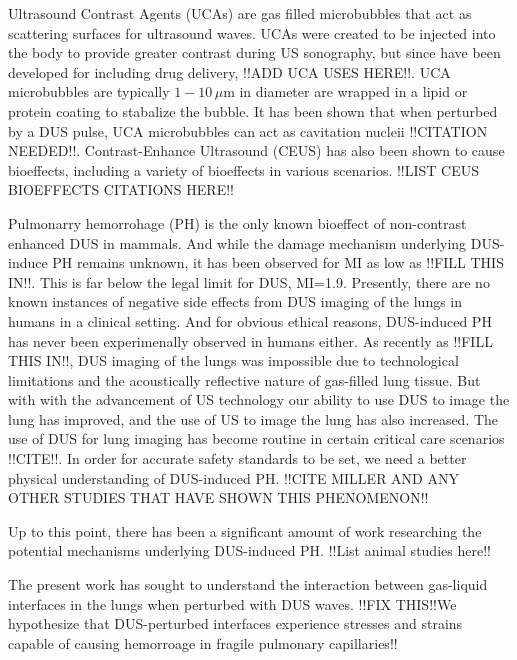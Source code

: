 Ultrasound Contrast Agents (UCAs) are gas filled microbubbles that act as scattering surfaces for ultrasound waves.
UCAs were created to be injected into the body to provide greater contrast during US sonography, but since have been developed for including drug delivery, !!ADD UCA USES HERE!!.
UCA microbubbles are typically $1 - 10 \, \mu$m in diameter are wrapped in a lipid or protein coating to stabalize the bubble.  
It has been shown that when perturbed by a DUS pulse, UCA microbubbles can act as cavitation nucleii !!CITATION NEEDED!!.
Contrast-Enhance Ultrasound (CEUS) has also been shown to cause bioeffects, including a variety of bioeffects in various scenarios.  
!!LIST CEUS BIOEFFECTS CITATIONS HERE!!


Pulmonarry hemorrohage (PH) is the only known bioeffect of non-contrast enhanced DUS in mammals.
And while the damage mechanism underlying DUS-induce PH remains unknown, it has been observed for MI as low as !!FILL THIS IN!!. 
This is far below the legal limit for DUS, MI=1.9.
Presently, there are no known instances of negative side effects from DUS imaging of the lungs in humans in a clinical setting.
And for obvious ethical reasons, DUS-induced PH has never been experimenally observed in humans either.
As recently as !!FILL THIS IN!!, DUS imaging of the lungs was impossible due to technological limitations and the acoustically reflective nature of gas-filled lung tissue.
But with with the advancement of US technology our ability to use DUS to image the lung has improved, and the use of US to image the lung has also increased.
The use of DUS for lung imaging has become routine in certain critical care scenarios !!CITE!!.
In order for accurate safety standards to be set, we need a better physical understanding of DUS-induced PH.
!!CITE MILLER AND ANY OTHER STUDIES THAT HAVE SHOWN THIS PHENOMENON!!

Up to this point, there has been a significant amount of work researching the potential mechanisms underlying DUS-induced PH.
!!List animal studies here!!

The present work has sought to understand the interaction between gas-liquid interfaces in the lungs when perturbed with DUS waves.
!!FIX THIS!!We hypothesize that DUS-perturbed interfaces experience stresses and strains capable of causing hemorroage in fragile pulmonary capillaries!!






